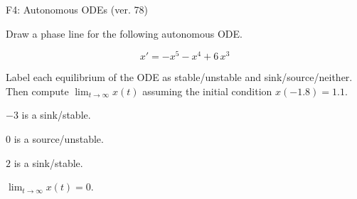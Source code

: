 \begin{exercise}
  \begin{exerciseTitle}F4: Autonomous ODEs (ver. 78)\end{exerciseTitle}
  \begin{exerciseStatement}
    

      Draw a phase line for the following 
      autonomous ODE.
    

    
\[x'= -x^{5} - x^{4} + 6 \, x^{3}\]

    

      Label each equilibrium of the ODE
      as stable/unstable and sink/source/neither.
      Then compute \(\lim_{t\to\infty}x(t)\)
      assuming the initial condition
      \(x( -1.8 )= 1.1\).
    

  \end{exerciseStatement}
  \begin{exerciseAnswer}
    

      \(-3\) is a sink/stable.
      
        \(0\) is a source/unstable.
      
      \(2\) is a sink/stable.
    

    

      \(\lim_{t\to\infty}x(t)=0\).
    

  \end{exerciseAnswer}
\end{exercise}